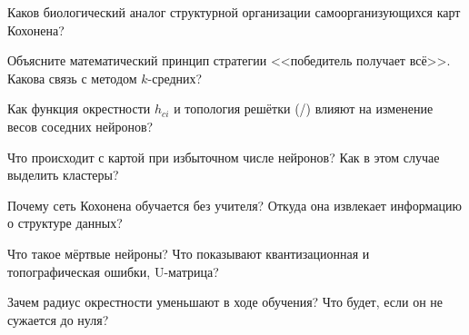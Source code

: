 \begin{questions}
\item Каков биологический аналог структурной организации самоорганизующихся карт Кохонена?
\item Объясните математический принцип стратегии <<победитель получает всё>>. Какова связь с методом
$k$-средних?
\item Как функция окрестности $h_{ci}$ и топология решётки (/) влияют на изменение
весов соседних нейронов?
\item Что происходит с картой при избыточном числе нейронов? Как в этом случае выделить кластеры?
\item Почему сеть Кохонена обучается без учителя? Откуда она извлекает информацию о структуре данных?
\item Что такое мёртвые нейроны? Что показывают квантизационная и топографическая ошибки, U-матрица?
\item Зачем радиус окрестности уменьшают в ходе обучения? Что будет, если он не сужается до нуля?
\end{questions}
